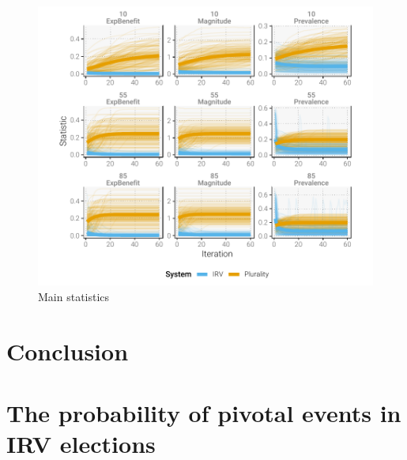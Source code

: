 \documentclass[11pt,a4paper]{article}
\begin{document}
\begin{figure}[]
	\centering
	\includegraphics[width = \textwidth]{../../output/figures/iterated_complete}
	\caption{Main statistics}
	\label{fig:main_stats}
\end{figure}

\section{Conclusion}




\newpage 


\singlespacing



\newpage 


\appendix 



\section{The probability of pivotal events in IRV elections} 

\end{document}
